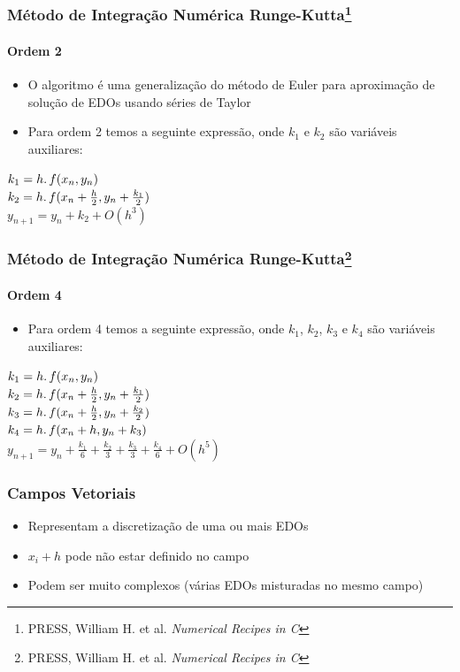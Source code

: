 \documentclass[brazil, 10pt]{beamer}
\begin{document}
\begin{frame}
  \frametitle{Método de Integração Numérica Runge-Kutta\footnote{PRESS, William H. et al. \textit{Numerical Recipes in C}}}
  \framesubtitle{Ordem 2}
  \begin{itemize}
    \item O algoritmo é uma generalização do método de Euler para aproximação de solução de EDOs usando séries de Taylor
    \item Para ordem 2 temos a seguinte expressão, onde $ k_{1} $ e $ k_{2} $ são variáveis auxiliares:
  \end{itemize}
 
  $ k_{1} = h\ldotp f(x_{n},y_{n}) $\\
  $ k_{2} = h\ldotp f(x_{n} + \frac{h}{2},y_{n} + \frac{k_{1}}{2}) $\\
  $ y_{n+1} = y_{n} + k_{2} + O(h^{3}) $ 
  
\end{frame}

\begin{frame}
  \frametitle{Método de Integração Numérica Runge-Kutta\footnote{PRESS, William H. et al. \textit{Numerical Recipes in C}}}
  \framesubtitle{Ordem 4}
  \begin{itemize}
    \item Para ordem 4 temos a seguinte expressão, onde $ k_{1} $, $ k_{2} $, $ k_{3} $ e $ k_{4} $ são variáveis auxiliares:
  \end{itemize}
 
  $ k_{1} = h\ldotp f(x_{n},y_{n}) $\\
  $ k_{2} = h\ldotp f(x_{n} + \frac{h}{2},y_{n} + \frac{k_{1}}{2}) $\\
  $ k_{3} = h\ldotp f(x_{n} + \frac{h}{2},y_{n} + \frac{k_{2}}{2}) $\\
  $ k_{4} = h\ldotp f(x_{n} + h,y_{n} + k_{3}) $\\
  $ y_{n+1} = y_{n} + \frac{k_{1}}{6} + \frac{k_{2}}{3} + \frac{k_{3}}{3} + \frac{k_{4}}{6} + O(h^{5}) $ 
  
\end{frame}

\begin{frame}
  \frametitle{Campos Vetoriais}

  \begin{itemize}
    \item Representam a discretização de uma ou mais EDOs
    \item $ x_{i} + h $ pode não estar definido no campo
    \item Podem ser muito complexos (várias EDOs misturadas no mesmo campo)
  \end{itemize}
\end{frame}
\end{document}
